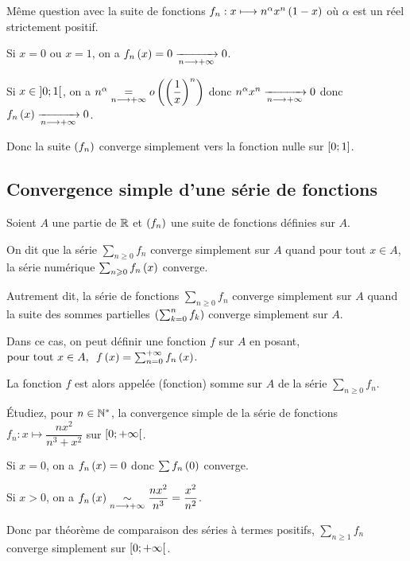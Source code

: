 \begin{exo}
Même question avec la suite de fonctions \(f_n:x\longmapsto n^\alpha x^n\left(1-x\right)\) où \(\alpha\) est un réel strictement positif.
\end{exo}

\begin{corr}
Si \(x=0\) ou \(x=1\), on a \(f_n\left(x\right)=0\xrightarrow[n\longrightarrow+\infty]{}0\).

Si \(x\in\left]0;1\right[\), on a \(n^\alpha\underset{n\longrightarrow+\infty}{=}o\left(\left(\dfrac{1}{x}\right)^n\right)\) donc \(n^\alpha x^n\xrightarrow[n\longrightarrow+\infty]{}0\) donc \(f_n\left(x\right)\xrightarrow[n\longrightarrow+\infty]{}0\).

Donc la suite \(\left(f_n\right)\) converge simplement vers la fonction nulle sur \(\left[0;1\right]\).
\end{corr}

\subsection{Convergence simple d'une série de fonctions}

\begin{defi}
Soient \(A\) une partie de \(\mathbb{R}\) et \(\left(f_n\right)\) une suite de fonctions définies sur \(A\).

On dit que la série \(\sum_{n\geq0}f_n\) converge simplement sur \(A\) quand pour tout \(x\in A\), la série numérique \(\sum_{n\geqslant0}f_n\left(x\right)\) converge.

Autrement dit, la série de fonctions \(\sum_{n\geq0}f_n\) converge simplement sur \(A\) quand la suite des sommes partielles \(\left(\sum_{k=0}^nf_k\right)\) converge simplement sur \(A\).

Dans ce cas, on peut définir une fonction \(f\) sur \(A\) en posant, \(\quantifs{\tpt x\in A}f\paren{x}=\sum_{n=0}^{\pinf}f_n\paren{x}\).

La fonction \(f\) est alors appelée (fonction) somme sur \(A\) de la série \(\sum_{n\geq0}f_n\).
\end{defi}

\begin{exo}
Étudiez, pour \(n\in\mathbb{N}^*\), la convergence simple de la série de fonctions \(f_n:x\mapsto\dfrac{nx^2}{n^3+x^2}\) sur \(\left[0;+\infty\right[\).
\end{exo}

\begin{corr}
Si \(x=0\), on a \(f_n\left(x\right)=0\) donc \(\sum f_n\left(0\right)\) converge.

Si \(x>0\), on a \(f_n\left(x\right)\underset{n\longrightarrow+\infty}{\sim}\dfrac{nx^2}{n^3}=\dfrac{x^2}{n^2}\).

Donc par théorème de comparaison des séries à termes positifs, \(\sum_{n\geq1}f_n\) converge simplement sur \(\left[0;+\infty\right[\).
\end{corr}

